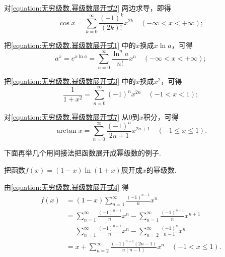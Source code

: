 对\cref{equation:无穷级数.幂级数展开式2} 两边求导，即得
\begin{equation}\label{equation:无穷级数.幂级数展开式5}
	\cos x = \sum_{k=0}^\infty \frac{(-1)^k}{(2k)!} x^{2k}
	\quad(-\infty<x<+\infty);
\end{equation}

把\cref{equation:无穷级数.幂级数展开式1} 中的\(x\)换成\(x \ln a\)，可得
\begin{equation}\label{equation:无穷级数.幂级数展开式6}
	a^x = e^{x \ln a} = \sum_{n=0}^\infty \frac{\ln^n a}{n!} x^n
	\quad(-\infty<x<+\infty);
\end{equation}

把\cref{equation:无穷级数.幂级数展开式3} 中的\(x\)换成\(x^2\)，可得
\begin{equation}\label{equation:无穷级数.幂级数展开式7}
	\frac{1}{1+x^2} = \sum_{n=0}^\infty (-1)^n x^{2n}
	\quad(-1<x<1);
\end{equation}

对\cref{equation:无穷级数.幂级数展开式7} 从\(0\)到\(x\)积分，可得
\begin{equation}
	\arctan x = \sum_{n=0}^\infty \frac{(-1)^n}{2n+1} x^{2n+1}
	\quad(-1 \leq x \leq 1).
\end{equation}

下面再举几个用间接法把函数展开成幂级数的例子.

\begin{example}
把函数\(f(x) = (1-x) \ln(1+x)\)展开成\(x\)的幂级数.
\begin{solution}
由\cref{equation:无穷级数.幂级数展开式4}
得\begin{align*}
	f(x) &= (1-x) \sum_{n=1}^\infty \frac{(-1)^{n-1}}{n} x^n \\
	&= \sum_{n=1}^\infty \frac{(-1)^{n-1}}{n} x^n
		- \sum_{n=1}^\infty \frac{(-1)^{n-1}}{n} x^{n+1} \\
	&= \sum_{n=1}^\infty \frac{(-1)^{n-1}}{n} x^n
		- \sum_{n=2}^\infty \frac{(-1)^n}{n-1} x^n \\
	&= x + \sum_{n=2}^\infty \frac{(-1)^{n-1} (2n-1)}{n(n-1)} x^n
	\quad(-1 < x \leq 1).
\end{align*}
\end{solution}
\end{example}

